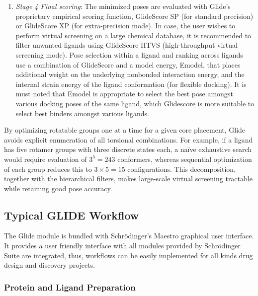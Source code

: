 \documentclass[12pt, a4paper]{article}
\begin{document}
\begin{enumerate}
  \item \textit{Stage 4 Final scoring}: The minimized poses are evaluated with Glide's proprietary empirical scoring function, GlideScore SP (for standard precision) or GlideScore XP (for extra-precision mode). In case, the user wishes to perform virtual screening on a large chemical database, it is recommended to filter unwanted ligands using GlideScore HTVS (high-throughput virtual screening mode). Pose selection within a ligand and ranking across ligands use a combination of GlideScore and a model energy, Emodel, that places additional weight on the underlying nonbonded interaction energy, and the internal strain energy of the ligand conformation (for flexible docking). It is must noted that Emodel is appropriate to select the best pose amongst various docking poses of the same ligand, which Glidescore is more suitable to select best binders amongst various ligands. 
\end{enumerate}

By optimizing rotatable groups one at a time for a given core placement, Glide avoids explicit enumeration of all torsional combinations. For example, if a ligand has five rotamer groups with three discrete states each, a naïve exhaustive search would require evaluation of $3^5 = 243$ conformers, whereas sequential optimization of each group reduces this to $3 \times 5 = 15$ configurations. This decomposition, together with the hierarchical filters, makes large-scale virtual screening tractable while retaining good pose accuracy.

\subsection{Typical GLIDE Workflow}

The Glide module is bundled with Schr\"{o}dinger's Maestro graphical user interface. It provides a user friendly interface with all modules provided by  Schr\"{o}dinger Suite are integrated, thus, workflows can be easily implemented for all kinds drug design and discovery projects. 

\subsubsection{Protein and Ligand Preparation}
\end{document}
